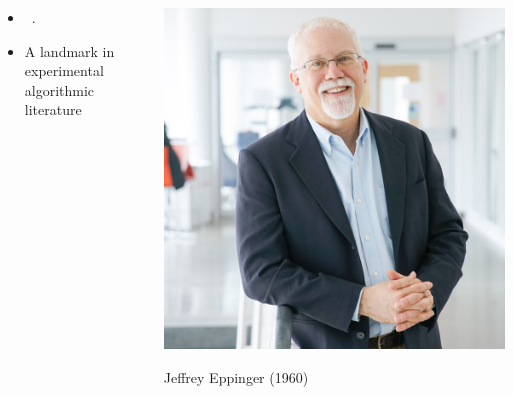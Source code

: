 \documentclass{beamer}
\begin{document}
\begin{frame}

    \begin{columns}[c]
        \begin{column}{0.5\textwidth}
            \begin{itemize}
                \item ~.
                \item A landmark in experimental algorithmic literature
            \end{itemize}
        \end{column}
        \begin{column}{0.5\textwidth}
            \includegraphics[width=\textwidth]{eppinger.jpg}
            \begin{center}
                Jeffrey Eppinger (1960)
            \end{center}
        \end{column}
    \end{columns}
\end{frame}
\end{document}
